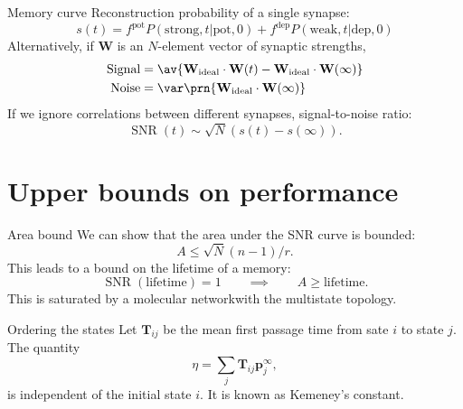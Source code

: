 \documentclass[final,hyperref={pdfpagelabels=false,bookmarks=false}]{beamer}
\newcommand{\citerr}[1]{\hfill {\footnotesize{\color{darkgrey}\cite{#1}}}}
\DeclareMathOperator{\SNR}{SNR}
\newcommand{\net}{molecular network}
\newcommand{\pot}{^\text{pot}}
\newcommand{\dep}{^\text{dep}}
\newcommand{\eq}{\mathbf{p}^\infty}
\newcommand{\fpt}{\mathbf{T}}
\newcommand{\W}{\mathbf{W}}
\begin{document}
\begin{frame}{}
\begin{columns}[t]
\begin{column}{0.32\linewidth}
\begin{block}{Memory curve}
 Reconstruction probability of a single synapse:
 \begin{equation*}
   s(t) = f\pot P(\text{strong},t|\text{pot},0) + f\dep P(\text{weak},t|\text{dep},0)
 \end{equation*}
 Alternatively, if $\W$ is an $N$-element vector of synaptic strengths,
 \begin{equation*}
   \begin{aligned}
     \text{Signal} &= \av{\W_\text{ideal} \cdot \W(t) -  \W_\text{ideal} \cdot \W(\infty)}\\
     \text{Noise} &= \var\prn{\W_\text{ideal} \cdot \W(\infty)}
   \end{aligned}
 \end{equation*}
 If we ignore correlations between different synapses, signal-to-noise ratio:
 \begin{equation*}
   \SNR(t) \sim \sqrt{N}(s(t)-s(\infty)).
 \end{equation*}
%
\end{block}


\section{Upper bounds on performance}


\begin{block}{Area bound}
%
 We can show that the area under the SNR curve is bounded:
 \begin{equation*}
   A \leq \sqrt{N}(n-1)/r.
 \end{equation*}
 This leads to a bound on the lifetime of a memory:
 \begin{equation*}
   \SNR(\text{lifetime})=1
   \qquad
   \implies
   \qquad
   A \geq \text{lifetime}.
 \end{equation*}
 This is saturated by a \net with the multistate topology.
%
\end{block}


\begin{block}{Ordering the states}
%
 Let $\fpt_{ij}$ be the mean first passage time from sate $i$ to state $j$. The quantity
 \begin{equation*}
   \eta = \sum_j \fpt_{ij} \eq_j,
 \end{equation*}
 is independent of the initial state $i$.
 It is known as Kemeney's constant. \citerr{kemeny1960finite}


\end{block}
\end{column}
\end{columns}
\end{frame}
\end{document}
